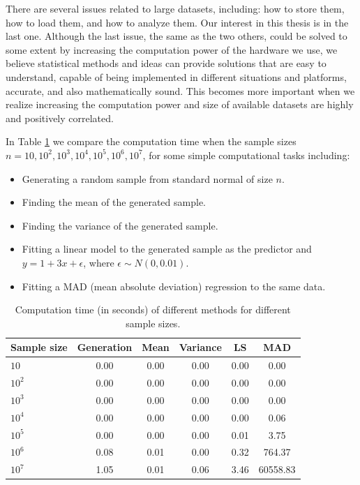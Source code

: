 \documentclass[11pt,a5paper,twoside]{book}
\begin{document}
There are several issues related to large datasets, including: how to store them, how to load them, and how to analyze them. Our interest in this thesis is in the last one. Although the last issue, the same as the two others, could be solved to some extent by increasing the computation power of the hardware we use, we believe statistical methods and ideas can provide solutions that are easy to understand, capable of being implemented in different situations and platforms, accurate, and also mathematically sound. This becomes more important when we realize increasing the computation power and size of available datasets are highly and positively correlated. 



In Table \ref{tab_comptime1} we compare the computation time when the sample sizes $n=10, 10^2, 10^3, 10^4, 10^5, 10^6, 10^7$, for some simple computational tasks including:

\begin{itemize}
\item Generating a random sample from standard normal of size $n$.
\item Finding the mean of the generated sample.
\item Finding the variance of the generated sample.
\item Fitting a linear model to the generated sample as the predictor and $y = 1 + 3x + \epsilon$, where $\epsilon\sim N(0, 0.01)$.
\item Fitting a MAD (mean absolute deviation) regression to the same data.
\end{itemize}



\begin{table}[ht]
\centering
\begin{tabular}{lccccc}
  \hline
Sample size & Generation & Mean & Variance & LS & MAD \\ 
  \hline
 $10$ & 0.00 & 0.00 & 0.00 & 0.00 & 0.00 \\ 
 $10^2$ & 0.00 & 0.00 & 0.00 & 0.00 & 0.00 \\ 
 $10^3$ & 0.00 & 0.00 & 0.00 & 0.00 & 0.00 \\ 
 $10^4$ & 0.00 & 0.00 & 0.00 & 0.00 & 0.06 \\ 
 $10^5$ & 0.00 & 0.00 & 0.00 & 0.01 & 3.75 \\ 
 $10^6$ & 0.08 & 0.01 & 0.00 & 0.32 & 764.37 \\ 
 $10^7$ & 1.05 & 0.01 & 0.06 & 3.46 & 60558.83 \\ 
   \hline
\end{tabular}
\caption{Computation time (in seconds) of different methods for different sample sizes.} 
\label{tab_comptime1}
\end{table}
\end{document}
